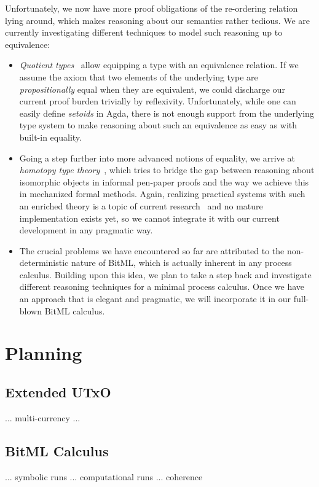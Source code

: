 \documentclass[acmsmall,nonacm=true,screen=true]{acmart}
\begin{document}
Unfortunately, we now have more proof obligations of the re-ordering relation lying around, which makes reasoning about
our semantics rather tedious. We are currently investigating different techniques to model such reasoning up to equivalence:
\begin{itemize}
\item \textit{Quotient types}~\cite{quotient} allow equipping a type with an equivalence relation.
If we assume the axiom that two elements of the underlying type are \textit{propositionally} equal when they are equivalent,
we could discharge our current proof burden trivially by reflexivity.
Unfortunately, while one can easily define \textit{setoids} in Agda, there is not enough support from the underlying type system to make reasoning about such an equivalence as easy as with built-in equality.
\item Going a step further into more advanced notions of equality, we arrive at \textit{homotopy type theory}~\cite{homotopy},
which tries to bridge the gap between reasoning about isomorphic objects in informal pen-paper proofs
and the way we achieve this in mechanized formal methods.
Again, realizing practical systems with such an enriched theory is a topic of current research~\cite{cubical} and no mature implementation exists yet, so we cannot integrate it with our current development in any pragmatic way.
\item The crucial problems we have encountered so far are attributed to the non-deterministic nature of BitML, which is actually
inherent in any process calculus. Building upon this idea, we plan to take a step back and investigate different reasoning
techniques for a minimal process calculus. Once we have an approach that is elegant and pragmatic, we will incorporate it
in our full-blown BitML calculus.
\end{itemize}

\newpage
\section{Planning}
\label{sec:plan}

\subsection{Extended UTxO}
... multi-currency ... 

\subsection{BitML Calculus}
... symbolic runs ... computational runs ... coherence
\end{document}
